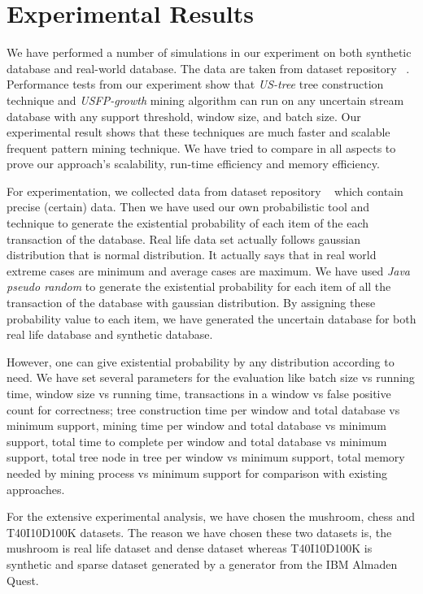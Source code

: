 \documentclass[conference]{IEEEtran}
\begin{document}
\section{Experimental Results}\label{Experiment}
We have performed a number of simulations in our experiment on both synthetic database and real-world database. The data are taken from dataset repository ~\cite{dataset}. Performance tests from our experiment show that \emph{US-tree} tree construction technique and \emph{USFP-growth} mining algorithm can run on any uncertain stream database with any support threshold, window size, and batch size. Our experimental result shows that these techniques are much faster and scalable frequent pattern mining technique. We have tried to compare in all aspects to prove our approach's scalability, run-time efficiency and memory efficiency.  

For experimentation, we collected data from dataset repository ~\cite{dataset} which contain precise (certain) data. Then we have used our own probabilistic tool and technique to generate the existential probability of each item of the each transaction of the database. Real life data set actually follows gaussian distribution that is normal distribution. It actually says that in real world extreme cases are minimum and average cases are maximum. We have used \emph{Java pseudo random} to generate the existential probability for each item of all the transaction of the database with gaussian distribution. By assigning these probability value to each item, we have generated the uncertain database for both real life database and synthetic database. 

However, one can give existential probability by any distribution according to need. We have set several parameters for the evaluation like batch size vs running time, window size vs running time, transactions in a window vs false positive count for correctness; tree construction time per window and total database vs minimum support, mining time per window and total database vs minimum support, total time to complete per window and total database vs minimum support, total tree node in tree per window vs minimum support, total memory needed by mining process vs minimum support for comparison with existing approaches.

For the extensive experimental analysis, we have chosen the mushroom, chess and T40I10D100K datasets. The reason we have chosen these two datasets is, the mushroom  is real life dataset and dense dataset whereas T40I10D100K  is synthetic and sparse dataset generated by a generator from the IBM Almaden Quest.
\end{document}
